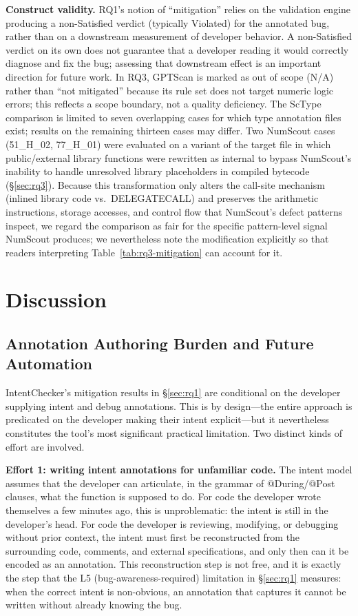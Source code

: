\documentclass[pdflatex,sn-basic]{sn-jnl}%
\theoremstyle{thmstyleone}%
\theoremstyle{thmstyletwo}%
\theoremstyle{thmstylethree}%
\begin{document}
\smallskip
\noindent\textbf{Construct validity.}
RQ1's notion of ``mitigation'' relies on the validation engine producing a non-Satisfied verdict (typically Violated) for the annotated bug, rather than on a downstream measurement of developer behavior.
A non-Satisfied verdict on its own does not guarantee that a developer reading it would correctly diagnose and fix the bug; assessing that downstream effect is an important direction for future work.
In RQ3, GPTScan is marked as out of scope (N/A) rather than ``not mitigated'' because its rule set does not target numeric logic errors; this reflects a scope boundary, not a quality deficiency.
The ScType comparison is limited to seven overlapping cases for which type annotation files exist; results on the remaining thirteen cases may differ.
Two NumScout cases (51\_H\_02, 77\_H\_01) were evaluated on a variant of the target file in which public/external library functions were rewritten as internal to bypass NumScout's inability to handle unresolved library placeholders in compiled bytecode (§\ref{sec:rq3}).
Because this transformation only alters the call-site mechanism (inlined library code vs.\ DELEGATECALL) and preserves the arithmetic instructions, storage accesses, and control flow that NumScout's defect patterns inspect, we regard the comparison as fair for the specific pattern-level signal NumScout produces; we nevertheless note the modification explicitly so that readers interpreting Table~\ref{tab:rq3-mitigation} can account for it.

\section{Discussion}\label{sec:discussion}

\subsection{Annotation Authoring Burden and Future Automation}\label{sec:disc:burden}

IntentChecker's mitigation results in §\ref{sec:rq1} are conditional on the developer supplying intent and debug annotations.
This is by design---the entire approach is predicated on the developer making their intent explicit---but it nevertheless constitutes the tool's most significant practical limitation.
Two distinct kinds of effort are involved.

\smallskip
\noindent\textbf{Effort 1: writing intent annotations for unfamiliar code.}
The intent model assumes that the developer can articulate, in the grammar of @During/@Post clauses, what the function is supposed to do.
For code the developer wrote themselves a few minutes ago, this is unproblematic: the intent is still in the developer's head.
For code the developer is reviewing, modifying, or debugging without prior context, the intent must first be reconstructed from the surrounding code, comments, and external specifications, and only then can it be encoded as an annotation.
This reconstruction step is not free, and it is exactly the step that the L5 (bug-awareness-required) limitation in §\ref{sec:rq1} measures: when the correct intent is non-obvious, an annotation that captures it cannot be written without already knowing the bug.
\end{document}
